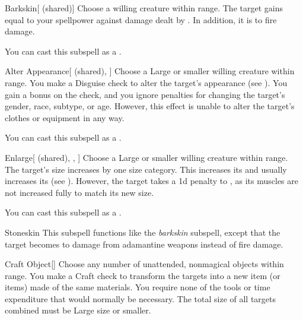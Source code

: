 \begin{ability}[\nth{2}]{Barkskin}[ (shared)]
Choose a willing creature within \rngclose range.
The target gains  equal to your spellpower against damage dealt by .
In addition, it is  to fire damage.

You can cast this subspell as a .
\end{ability}
\vspace{0.25em}


\begin{ability}[\nth{3}]{Alter Appearance}[ (shared), ]
Choose a Large or smaller willing creature within \rngclose range.
You make a Disguise check to alter the target's appearance (see ).
You gain a  bonus on the check, and you ignore penalties for changing the target's gender, race, subtype, or age.
However, this effect is unable to alter the target's clothes or equipment in any way.

You can cast this subspell as a .
\end{ability}
\vspace{0.25em}


\begin{ability}[\nth{3}]{Enlarge}[ (shared), , ]
Choose a Large or smaller willing creature within \rngclose range.
The target's size increases by one size category.
This increases its  and usually increases its  (see ).
However, the target takes a \minus1d penalty to , as its muscles are not increased fully to match its new size.

You can cast this subspell as a .
\end{ability}
\vspace{0.25em}


\begin{ability}[\nth{3}]{Stoneskin}
This subspell functions like the \textit{barkskin} subspell, except that the target becomes  to damage from adamantine weapons instead of fire damage.
\end{ability}
\vspace{0.25em}


\begin{ability}[\nth{4}]{Craft Object}[]
Choose any number of unattended, nonmagical objects within \rngclose range.
You make a Craft check to transform the targets into a new item (or items) made of the same materials.
You require none of the tools or time expenditure that would normally be necessary.
The total size of all targets combined must be Large size or smaller.
\end{ability}
\vspace{0.25em}


